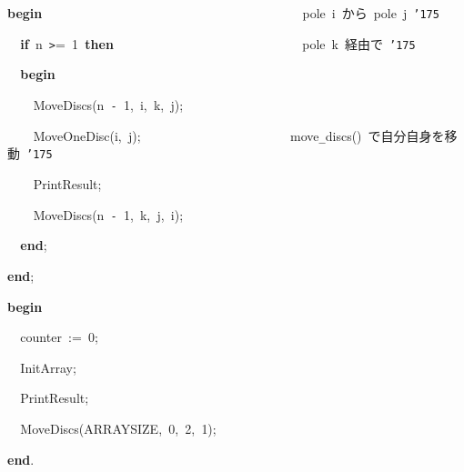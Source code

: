 \documentclass{article}
\begin{document}
\noindent
\mbox{}{\textbf{b}}{\textbf{e}}{\textbf{g}}{\textbf{i}}{\textbf{n}}{\tt\mc \ \ \ \ \ \ \ \ \ \ \ \ \ \ \ \ \ \ \ \ \ \ \ \ \ \ \ \ \ \ \ \ \ \ \ \ \ \ \ }\rm{}\ pole\ i\ から\ pole\ j\ {\tt\char'175}
\tt\mc 

\noindent
\mbox{}{\tt\mc \ \ }{\textbf{i}}{\textbf{f}}{\tt\mc \ }n{\tt\mc \ }{\tt >}={\tt\mc \ }1{\tt\mc \ }{\textbf{t}}{\textbf{h}}{\textbf{e}}{\textbf{n}}{\tt\mc \ \ \ \ \ \ \ \ \ \ \ \ \ \ \ \ \ \ \ \ \ \ \ \ \ \ \ \ }\rm{}\ pole\ k\ 経由で\ {\tt\char'175}
\tt\mc 

\noindent
\mbox{}{\tt\mc \ \ }{\textbf{b}}{\textbf{e}}{\textbf{g}}{\textbf{i}}{\textbf{n}}

\noindent
\mbox{}{\tt\mc \ \ \ \ }MoveDiscs(n{\tt\mc \ }{\tt -}{\tt\mc \ }1,{\tt\mc \ }i,{\tt\mc \ }k,{\tt\mc \ }j);

\noindent
\mbox{}{\tt\mc \ \ \ \ }MoveOneDisc(i,{\tt\mc \ }j);{\tt\mc \ \ \ \ \ \ \ \ \ \ \ \ \ \ \ \ \ \ \ \ \ \ }\rm{}\ move{\tt\_}discs()\ で自分自身を移動\ {\tt\char'175}
\tt\mc 

\noindent
\mbox{}{\tt\mc \ \ \ \ }PrintResult;

\noindent
\mbox{}{\tt\mc \ \ \ \ }MoveDiscs(n{\tt\mc \ }{\tt -}{\tt\mc \ }1,{\tt\mc \ }k,{\tt\mc \ }j,{\tt\mc \ }i);

\noindent
\mbox{}{\tt\mc \ \ }{\textbf{e}}{\textbf{n}}{\textbf{d}};

\noindent
\mbox{}{\textbf{e}}{\textbf{n}}{\textbf{d}};

\noindent
\mbox{}\hfill

\noindent
\mbox{}{\textbf{b}}{\textbf{e}}{\textbf{g}}{\textbf{i}}{\textbf{n}}

\noindent
\mbox{}{\tt\mc \ \ }counter{\tt\mc \ }:={\tt\mc \ }0;

\noindent
\mbox{}{\tt\mc \ \ }InitArray;

\noindent
\mbox{}{\tt\mc \ \ }PrintResult;

\noindent
\mbox{}{\tt\mc \ \ }MoveDiscs(ARRAYSIZE,{\tt\mc \ }0,{\tt\mc \ }2,{\tt\mc \ }1);

\noindent
\mbox{}{\textbf{e}}{\textbf{n}}{\textbf{d}}.

\noindent
\mbox{}

\rm\mc
\end{document}
